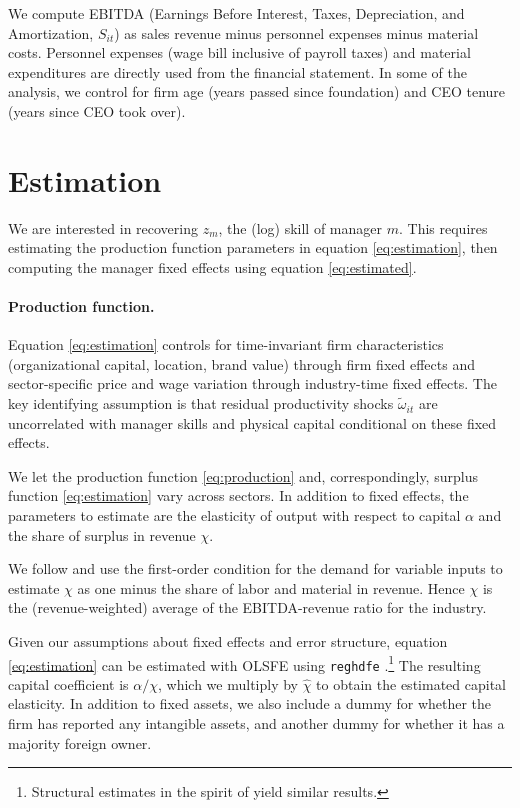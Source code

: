 We compute EBITDA (Earnings Before Interest, Taxes, Depreciation, and Amortization, $S_{it}$) as sales revenue minus personnel expenses minus material costs. Personnel expenses (wage bill inclusive of payroll taxes) and material expenditures are directly used from the financial statement. In some of the analysis, we control for firm age (years passed since foundation) and CEO tenure (years since CEO took over).

\section{Estimation}

We are interested in recovering $z_m$, the (log) skill of manager $m$. This requires estimating the production function parameters in equation \eqref{eq:estimation}, then computing the manager fixed effects using equation \eqref{eq:estimated}.

\paragraph{Production function.}
Equation \eqref{eq:estimation} controls for time-invariant firm characteristics (organizational capital, location, brand value) through firm fixed effects and sector-specific price and wage variation through industry-time fixed effects. The key identifying assumption is that residual productivity shocks $\tilde{\omega}_{it}$ are uncorrelated with manager skills and physical capital conditional on these fixed effects.

We let the production function \eqref{eq:production} and, correspondingly, surplus function \eqref{eq:estimation} vary across sectors. In addition to fixed effects, the parameters to estimate are the elasticity of output with respect to capital $\alpha$ and the share of surplus in revenue $\chi$. 

We follow \citet{Gandhi2020-nu} and use the first-order condition for the demand for variable inputs to estimate $\chi$ as one minus the share of labor and material in revenue. Hence $\chi$ is the (revenue-weighted) average of the EBITDA-revenue ratio for the industry.

Given our assumptions about fixed effects and error structure, equation \eqref{eq:estimation} can be estimated with OLSFE using \texttt{reghdfe} \citep{reghdfe}.\footnote{Structural estimates in the spirit of \citet{Olley1996-wy} yield similar results.} The resulting capital coefficient is $\alpha/\chi$, which we multiply by $\hat\chi$ to obtain the estimated capital elasticity. In addition to fixed assets, we also include a dummy for whether the firm has reported any intangible assets, and another dummy for whether it has a majority foreign owner.

